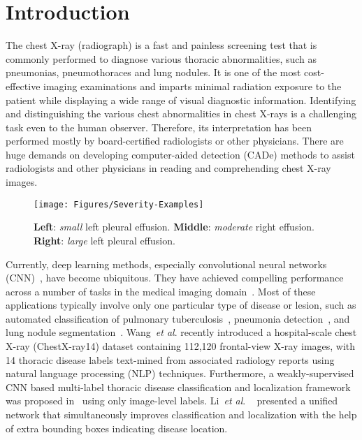 \documentclass[runningheads,a4paper]{llncs}
\newcommand{\etal}{\textit{et al}. }
\begin{document}
\section{Introduction}
The chest X-ray (radiograph) is a fast and painless screening test that is commonly performed to diagnose various thoracic abnormalities, such as pneumonias, pneumothoraces and lung nodules. It is one of the most cost-effective imaging examinations and imparts minimal radiation exposure to the patient while displaying a wide range of visual diagnostic information. Identifying and distinguishing the various chest abnormalities in chest X-rays is a challenging task even to the human observer. Therefore, its interpretation has been performed mostly by board-certified radiologists or other physicians. There are huge demands on developing computer-aided detection (CADe) methods to assist radiologists and other physicians in reading and comprehending chest X-ray images.

\begin{figure*}[t!]
	\centering
	\texttt{[image: Figures/Severity-Examples]}
	\caption{\textbf{Left}: \textit{small} left pleural effusion. \textbf{Middle}: \textit{moderate} right effusion. \textbf{Right}: \textit{large} left pleural effusion.
	}
	\label{fig:severity}
\end{figure*}

Currently, deep learning methods, especially convolutional neural networks (CNN)~\cite{AlexNet_NIPS2012,Tang_CVPR16}, have become ubiquitous. They have achieved compelling performance across a number of tasks in the medical imaging domain~\cite{Yan_JMI_2018,Tang_MICCAI18}. Most of these applications typically involve only one particular type of disease or lesion, such as automated classification of pulmonary tuberculosis~\cite{Lakhani_Radiology_2017}, pneumonia detection~\cite{Rajpurkar_2017_chexnet}, and lung nodule segmentation~\cite{Jin_MICCAI18}. Wang~\etal \cite{Wang_CVPR2017} recently introduced a hospital-scale chest X-ray (ChestX-ray14) dataset containing 112,120 frontal-view X-ray images, with 14 thoracic disease labels text-mined from associated radiology reports using natural language processing (NLP) techniques.
Furthermore, a weakly-supervised CNN based multi-label thoracic disease classification and localization framework was proposed in~\cite{Wang_CVPR2017} using only image-level labels. Li~\etal~\cite{Li_2018_CVPR} presented a unified network that simultaneously improves classification and localization with the help of extra bounding boxes indicating disease location.
\end{document}
